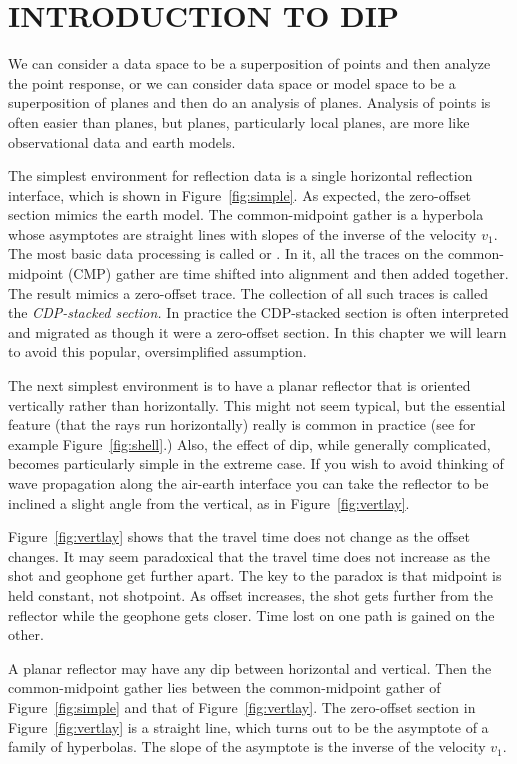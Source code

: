 \section{INTRODUCTION TO DIP}
We can consider a data space to be a superposition of points
and then analyze the point response,
or we can consider data space
or model space to be a superposition of planes
and then do an analysis of planes.
Analysis of points is often easier than planes,
but planes, particularly local planes,
are more like observational data and earth models.
\par
The simplest environment for reflection data
is a single horizontal reflection interface,
which is shown in Figure~\ref{fig:simple}.
\newslide
As expected, the zero-offset section mimics the earth model.
The common-midpoint gather is a hyperbola
whose asymptotes are straight lines
with slopes of the inverse of the velocity  $v_1$.
The most basic data processing is called
{\em 
{}
}
or .
In it, all the traces on the common-midpoint (CMP) gather
are time shifted into alignment
and then added together.
The result mimics a zero-offset trace.
The collection of all such traces is called the
{\em 
CDP-stacked section.
}
In practice the CDP-stacked section is often interpreted and migrated
as though it were a zero-offset section.
In this chapter we will learn to avoid this popular,
oversimplified assumption.
\par
The next simplest environment is to have a planar reflector
that is oriented vertically rather than horizontally.
This might not seem typical,
but the essential feature (that the rays run horizontally)
really is common in practice
(see for example Figure~\ref{fig:shell}.)
Also, the effect of dip, while generally complicated,
becomes particularly simple in the extreme case.
If you wish to avoid thinking of 
wave propagation along the air-earth interface
you can take the reflector to be inclined a slight angle from the vertical,
as in Figure~\ref{fig:vertlay}.
\newslide
\par
Figure~\ref{fig:vertlay} shows that the travel time
does not change as the offset changes.
It may seem paradoxical that the travel time does not increase as
the shot and geophone get further apart.
The key to the paradox is that midpoint is held constant, not shotpoint.
As offset increases,
the shot gets further from the reflector
while the geophone gets closer.
Time lost on one path is gained on the other.
\par
A planar reflector may have any dip between horizontal and vertical.
Then the common-midpoint gather lies between
the common-midpoint gather of Figure~\ref{fig:simple}
and that of Figure~\ref{fig:vertlay}.
The zero-offset section in Figure~\ref{fig:vertlay} is a straight line,
which turns out to be the asymptote of a family of hyperbolas.
The slope of the asymptote is the inverse of the velocity  $v_1$.

